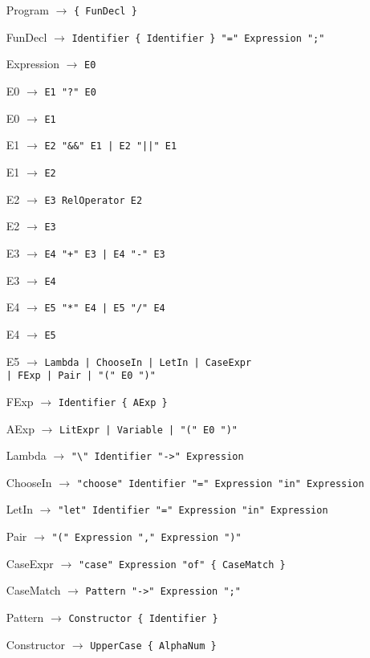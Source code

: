 \documentclass[class=article, crop=false]{standalone}
\begin{document}
\begin{itemize}
  \item[Program] $\rightarrow$ \verb`{ FunDecl }`
  \item[FunDecl] $\rightarrow$ \verb`Identifier { Identifier } "=" Expression ";"`
  \item[Expression] $\rightarrow$ \verb`E0`
  \item[E0] $\rightarrow$ \verb`E1 "?" E0`
  \item[E0] $\rightarrow$ \verb`E1`
  \item[E1] $\rightarrow$ \verb`E2 "&&" E1 | E2 "||" E1`
  \item[E1] $\rightarrow$ \verb`E2`
  \item[E2] $\rightarrow$ \verb`E3 RelOperator E2`
  \item[E2] $\rightarrow$ \verb`E3`
  \item[E3] $\rightarrow$ \verb`E4 "+" E3 | E4 "-" E3`
  \item[E3] $\rightarrow$ \verb`E4`
  \item[E4] $\rightarrow$ \verb`E5 "*" E4 | E5 "/" E4`
  \item[E4] $\rightarrow$ \verb`E5`
  \item[E5] $\rightarrow$ \verb`Lambda | ChooseIn | LetIn | CaseExpr` \\
                          \verb`| FExp | Pair | "(" E0 ")"`
  \item[FExp] $\rightarrow$ \verb`Identifier { AExp }`
  \item[AExp] $\rightarrow$ \verb`LitExpr | Variable | "(" E0 ")"`
  \item[Lambda] $\rightarrow$ \verb`"\" Identifier "->" Expression`
  \item[ChooseIn] $\rightarrow$ \verb`"choose" Identifier "=" Expression "in" Expression`
  \item[LetIn] $\rightarrow$ \verb`"let" Identifier "=" Expression "in" Expression`
  \item[Pair] $\rightarrow$ \verb`"(" Expression "," Expression ")"`
  \item[CaseExpr] $\rightarrow$ \verb`"case" Expression "of" { CaseMatch }`
  \item[CaseMatch] $\rightarrow$ \verb`Pattern "->" Expression ";"`
  \item[Pattern] $\rightarrow$ \verb`Constructor { Identifier }`
  \item[Constructor] $\rightarrow$ \verb`UpperCase { AlphaNum }`
\end{itemize}
\end{document}
